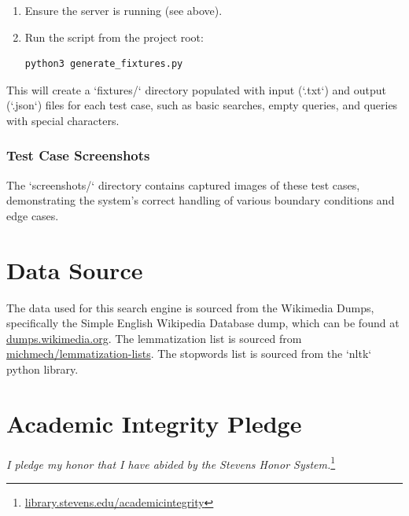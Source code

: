 \documentclass[11pt, a4paper]{article}
\begin{document}
\begin{enumerate}
    \item Ensure the server is running (see above).
    \item Run the script from the project root:
    \begin{verbatim}
python3 generate_fixtures.py
    \end{verbatim}
\end{enumerate}

This will create a `fixtures/` directory populated with input (`.txt`) and output (`.json`) files for each test case, such as basic searches, empty queries, and queries with special characters.

\subsubsection*{Test Case Screenshots}
The `screenshots/` directory contains captured images of these test cases, demonstrating the system's correct handling of various boundary conditions and edge cases.

\section{Data Source}

The data used for this search engine is sourced from the Wikimedia Dumps, specifically the Simple English Wikipedia Database dump, which can be found at \href{https://dumps.wikimedia.org/}{dumps.wikimedia.org}.
The lemmatization list is sourced from \href{https://github.com/michmech/lemmatization-lists}{michmech/lemmatization-lists}.
The stopwords list is sourced from the `nltk` python library.

\newpage

\section*{Academic Integrity Pledge}
\emph{I pledge my honor that I have abided by the Stevens Honor System.}\footnote{\href{https://library.stevens.edu/academicintegrity\#s-lg-link-list-70154023}{library.stevens.edu/academicintegrity}}
\end{document}
